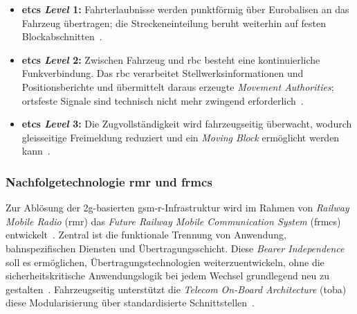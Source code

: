 \documentclass[runningheads]{res/llncs}
\begin{document}
\begin{itemize}
    \item \textbf{\gls{etcs} \textit{Level} 1:} Fahrterlaubnisse werden punktförmig über Eurobalisen an das Fahrzeug übertragen; die Streckeneinteilung beruht weiterhin auf festen Blockabschnitten~\parencite[S. 50, 71]{trinckaufETCS2024}.
    \item \textbf{\gls{etcs} \textit{Level} 2:} Zwischen Fahrzeug und \gls{rbc} besteht eine kontinuierliche Funkverbindung. Das \gls{rbc} verarbeitet Stellwerksinformationen und Positionsberichte und übermittelt daraus erzeugte \textit{Movement Authorities}; ortsfeste Signale sind technisch nicht mehr zwingend erforderlich~\parencite[S. 71, 89--90]{trinckaufETCS2024}.
    \item \textbf{\gls{etcs} \textit{Level} 3:} Die Zugvollständigkeit wird fahrzeugseitig überwacht, wodurch gleisseitige Freimeldung reduziert und ein \textit{Moving Block} ermöglicht werden kann~\parencite[S. 471--472]{trinckaufETCS2024}.
\end{itemize}

\subsubsection{\texorpdfstring{Nachfolgetechnologie \gls{rmr} und \gls{frmcs}}{Nachfolgetechnologie RMR und FRMCS}}
\label{sec:Nachfolgetechnologie_RMR_und_FRMCS}
Zur Ablösung der \gls{2g}-basierten \gls{gsm-r}-Infrastruktur wird im Rahmen von \textit{Railway Mobile Radio} (\gls{rmr}) das \textit{Future Railway Mobile Communication System} (\gls{frmcs}) entwickelt~\parencite[S. 49, 123]{trinckaufETCS2024}. Zentral ist die funktionale Trennung von Anwendung, bahnspezifischen Diensten und Übertragungsschicht. Diese \textit{Bearer Independence} soll es ermöglichen, Übertragungstechnologien weiterzuentwickeln, ohne die sicherheitskritische Anwendungslogik bei jedem Wechsel grundlegend neu zu gestalten~\parencite[S. 123, 211]{trinckaufETCS2024}. Fahrzeugseitig unterstützt die \textit{Telecom On-Board Architecture} (\gls{toba}) diese Modularisierung über standardisierte Schnittstellen~\parencite[S. 123, 219]{trinckaufETCS2024}.
\end{document}
